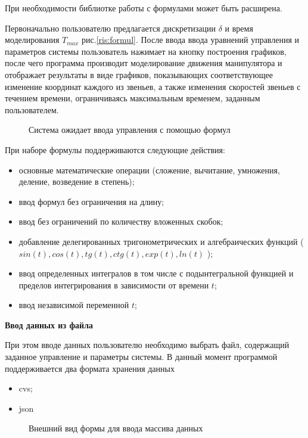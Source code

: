 При необходимости библиотке работы с формулами может быть расширена.

Первоначально пользователю предлагается дискретизации $\delta$  и время моделирования  $T_{max}$ рис.\eqref{ris:formul}. После ввода ввода уравнений управления и параметров системы пользователь нажимает на кнопку построения графиков, после чего программа производит моделирование движения манипулятора и отображает результаты в виде графиков, показывающих соответствующее изменение координат каждого из звеньев, а также изменения скоростей звеньев с течением времени, ограничиваясь максимальным временем, заданным пользователем.

\begin{figure}[h]
\caption{Система ожидает ввода управления с помощью формул}
\label{ris:formul}
\end{figure}

При наборе формулы поддерживаются следующие действия:
\begin{itemize}
\item{основные математические операции (сложение, вычитание, умножения, деление, возведение в степень);}
\item{ввод формул без ограничения на длину;}
\item{ввод без ограничений по количеству вложенных скобок;}
\item{добавление делегированных тригонометрических и алгебраических функций ($sin(t), cos(t), tg(t), ctg(t), exp(t), ln(t)$ );}
\item{ввод определенных интегралов в том числе с подынтегральной функцией и пределов интегрирования в зависимости от времени $t$;}
\item{ввод независимой переменной $t$;}
\end{itemize}

\textbf{Ввод данных из файла}

При этом вводе данных пользователю необходимо выбрать файл, содержащий заданное управление и параметры системы. В данный момент программой поддерживается два формата хранения данных

\begin{itemize}
\item{cvs;}
\item{json}
\end{itemize}

\begin{figure}[h]
\caption{Внешний вид формы для ввода массива данных}
\label{ris:mass}
\end{figure}


